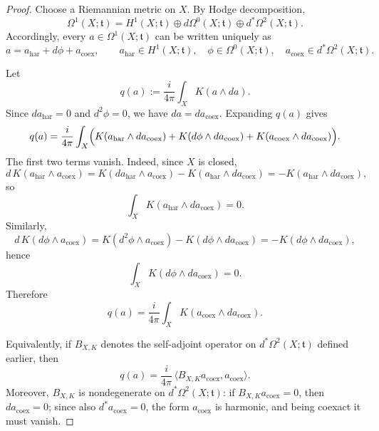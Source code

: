 \documentclass[10pt,a4paper]{amsart}
\begin{document}
\begin{proof}
Choose a Riemannian metric on \(X\). By Hodge decomposition,
\[
\Omega^1(X;\mathfrak t)
=
H^1(X;\mathfrak t)
\oplus
d\Omega^0(X;\mathfrak t)
\oplus
d^*\Omega^2(X;\mathfrak t).
\]
Accordingly, every \(a\in \Omega^1(X;\mathfrak t)\) can be written uniquely as
\[
a=a_{\mathrm{har}}+d\phi+a_{\mathrm{coex}},
\qquad
a_{\mathrm{har}}\in H^1(X;\mathfrak t),\quad
\phi\in \Omega^0(X;\mathfrak t),\quad
a_{\mathrm{coex}}\in d^*\Omega^2(X;\mathfrak t).
\]

Let
\[
q(a):=\frac{i}{4\pi}\int_X K(a\wedge da).
\]
Since \(da_{\mathrm{har}}=0\) and \(d^2\phi=0\), we have $da=da_{\mathrm{coex}}.$ Expanding \(q(a)\) gives
\[
q(a)
=
\frac{i}{4\pi}\int_X
\Bigl(
K(a_{\mathrm{har}}\wedge da_{\mathrm{coex}})
+
K(d\phi\wedge da_{\mathrm{coex}})
+
K(a_{\mathrm{coex}}\wedge da_{\mathrm{coex}})
\Bigr).
\]
The first two terms vanish. Indeed, since \(X\) is closed,
\[
d\,K(a_{\mathrm{har}}\wedge a_{\mathrm{coex}})
=
K(da_{\mathrm{har}}\wedge a_{\mathrm{coex}})
-
K(a_{\mathrm{har}}\wedge da_{\mathrm{coex}})
=
-
K(a_{\mathrm{har}}\wedge da_{\mathrm{coex}}),
\]
so
\[
\int_X K(a_{\mathrm{har}}\wedge da_{\mathrm{coex}})=0.
\]
Similarly,
\[
d\,K(d\phi\wedge a_{\mathrm{coex}})
=
K(d^2\phi\wedge a_{\mathrm{coex}})
-
K(d\phi\wedge da_{\mathrm{coex}})
=
-
K(d\phi\wedge da_{\mathrm{coex}}),
\]
hence
\[
\int_X K(d\phi\wedge da_{\mathrm{coex}})=0.
\]
Therefore
\[
q(a)=\frac{i}{4\pi}\int_X K(a_{\mathrm{coex}}\wedge da_{\mathrm{coex}}).
\]

Equivalently, if \(B_{X,K}\) denotes the self-adjoint operator on
\(d^*\Omega^2(X;\mathfrak t)\) defined earlier, then
\[
q(a)=\frac{i}{4\pi}\,\langle B_{X,K}a_{\mathrm{coex}},a_{\mathrm{coex}}\rangle.
\]
Moreover, \(B_{X,K}\) is nondegenerate on \(d^*\Omega^2(X;\mathfrak t)\): if
\(B_{X,K}a_{\mathrm{coex}}=0\), then \(da_{\mathrm{coex}}=0\); since also
\(d^*a_{\mathrm{coex}}=0\), the form \(a_{\mathrm{coex}}\) is harmonic, and being
coexact it must vanish.


\end{proof}
\end{document}

